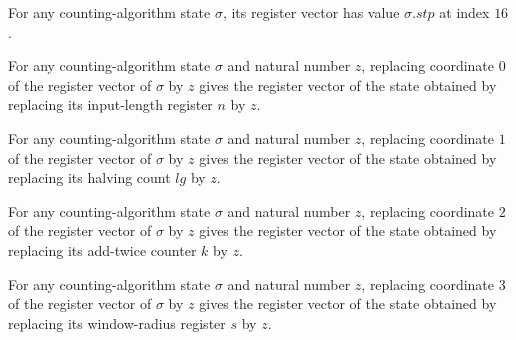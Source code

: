 \begin{lemma}
\label{Complexity.LogProg.ISCount.St.toV_stp}
\leanok
{}
For any counting-algorithm state $\sigma$, its register vector has value $\sigma.stp$ at
index $16$.
\end{lemma}

\begin{lemma}
\label{Complexity.LogProg.ISCount.St.upd_n}
\leanok
{}
For any counting-algorithm state $\sigma$ and natural number $z$, replacing coordinate
$0$ of the register vector of $\sigma$ by $z$ gives the register vector of the state
obtained by replacing its input-length register $n$ by $z$.
\end{lemma}

\begin{lemma}
\label{Complexity.LogProg.ISCount.St.upd_lg}
\leanok
{}
For any counting-algorithm state $\sigma$ and natural number $z$, replacing coordinate
$1$ of the register vector of $\sigma$ by $z$ gives the register vector of the state
obtained by replacing its halving count $lg$ by $z$.
\end{lemma}

\begin{lemma}
\label{Complexity.LogProg.ISCount.St.upd_k}
\leanok
{}
For any counting-algorithm state $\sigma$ and natural number $z$, replacing coordinate
$2$ of the register vector of $\sigma$ by $z$ gives the register vector of the state
obtained by replacing its add-twice counter $k$ by $z$.
\end{lemma}

\begin{lemma}
\label{Complexity.LogProg.ISCount.St.upd_s}
\leanok
{}
For any counting-algorithm state $\sigma$ and natural number $z$, replacing coordinate
$3$ of the register vector of $\sigma$ by $z$ gives the register vector of the state
obtained by replacing its window-radius register $s$ by $z$.
\end{lemma}

